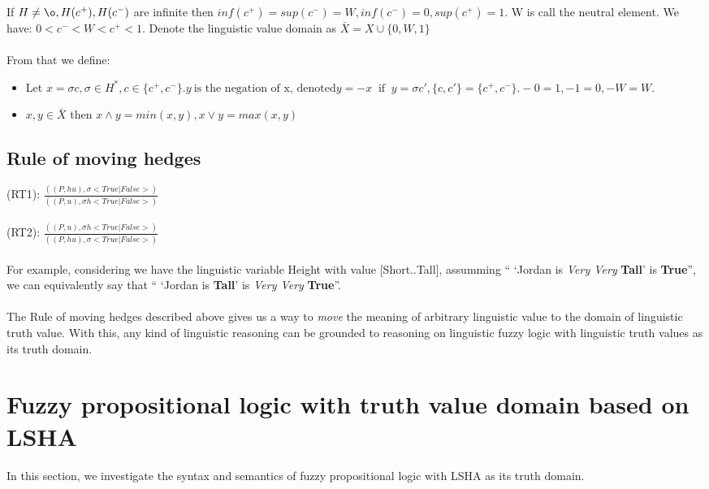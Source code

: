\documentclass[part1.tex]{subfiles}
\begin{document}
If \(H \neq {\o}, H(c^+), H(c^-)\) are infinite then \(inf(c^+) = sup(c^-) = W, inf(c^-) = 0, sup(c^+) = 1\). W is call the neutral element. We have: \(0<c^-<W<c^+<1\). Denote the linguistic value domain as
\(\bar X = X \cup \{0,W,1\}\)\\\\

From that we define:
\begin{itemize}
\item Let \(x = \sigma c, \sigma \in H^*, c \in \{c^+, c^-\}. y\: \text{is the negation of x, denoted}
	y = -x\: \text{ if }\: y = \sigma c', \{c,c'\} = \{c^+, c^-\}. -0 = 1, -1 = 0, -W = W\).
\item \(x,y \in \bar X\) then \(x \wedge y = min(x,y), x \vee y = max(x,y)\)
\end{itemize}


\subsection{Rule of moving hedges}
\indent (RT1): \(\frac{((P,hu),\sigma <True|False>)} {((P,u),\sigma h<True|False>)}\)
\\
\\
	(RT2): \(\frac{((P,u),\sigma h<True|False>)} {((P,hu),\sigma <True|False>)}\)
\paragraph{} For example, considering we have the linguistic
variable Height with value [Short..Tall], assumming `` `Jordan is
{\em Very Very} {\bf Tall}' is {\bf True}'', we can equivalently
say that `` `Jordan is {\bf Tall}' is {\em Very Very} {\bf
True}''. 
\paragraph{} The Rule of moving hedges described above gives us a
way to {\em move} the meaning of arbitrary linguistic value to
the domain of linguistic truth value. With this, any kind of
linguistic reasoning can be grounded to reasoning on linguistic
fuzzy logic with linguistic truth values as its truth domain.
\section{Fuzzy propositional logic with truth value domain based on
LSHA}
\paragraph{} In this section, we investigate the syntax and
semantics of fuzzy propositional logic with LSHA as its truth
domain. 
\end{document}
